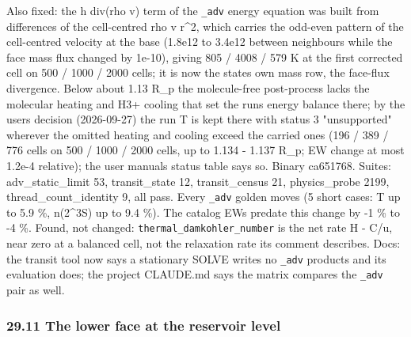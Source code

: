\documentclass[english,a4paper]{my_memo}
\begin{document}
Also fixed: the h div(rho v) term of the \texttt{\_adv} energy equation was built
from differences of the cell-centred rho v r\^{}2, which carries the odd-even
pattern of the cell-centred velocity at the base (1.8e12 to 3.4e12 between
neighbours while the face mass flux changed by 1e-10), giving 805 / 4008 /
579 K at the first corrected cell on 500 / 1000 / 2000 cells; it is now the
state\textquotesingle s own mass row, the face-flux divergence. Below about 1.13 R\_p the
molecule-free post-process lacks the molecular heating and H3+ cooling that
set the run\textquotesingle s energy balance there; by the user\textquotesingle s decision (2026-09-27) the
run T is kept there with status 3 "unsupported" wherever the omitted heating
and cooling exceed the carried ones (196 / 389 / 776 cells on 500 / 1000 /
2000 cells, up to 1.134 - 1.137 R\_p; EW change at most 1.2e-4 relative);
the user manual\textquotesingle s status table says so. Binary ca651768.
Suites: adv\_static\_limit 53, transit\_state 12, transit\_census 21,
physics\_probe 2199, thread\_count\_identity 9, all pass. Every \texttt{\_adv} golden
moves (5 short cases: T up to 5.9 \%, n(2\^{}3S) up to 9.4 \%). The catalog EWs
predate this change by -1 \% to -4 \%. Found, not changed:
\texttt{thermal\_damkohler\_number} is the net rate \textbar H - C\textbar/u, near zero at a
balanced cell, not the relaxation rate its comment describes.
Docs: the transit tool now says a stationary SOLVE writes no \texttt{\_adv} products
and its evaluation does; the project CLAUDE.md says the matrix compares the
\texttt{\_adv} pair as well.

\subsubsection{29.11 The lower face at the reservoir level}\label{2911-the-lower-face-at-the-reservoir-level}
\end{document}
